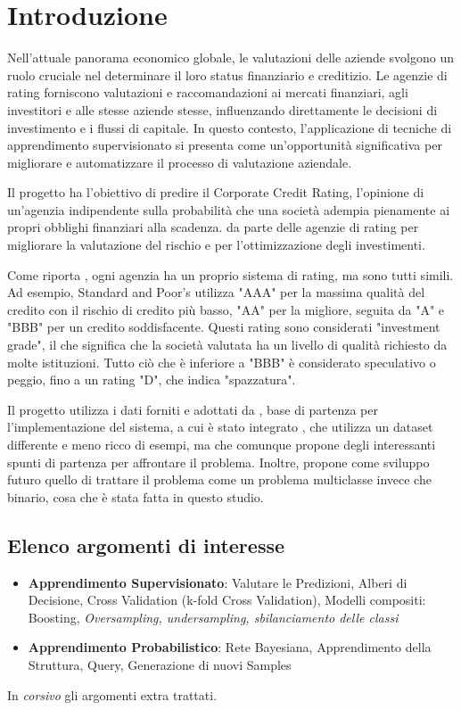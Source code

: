 \section{Introduzione}

\noindent Nell'attuale panorama economico globale, le valutazioni delle aziende svolgono un ruolo cruciale nel determinare il loro status finanziario e creditizio. Le agenzie di rating forniscono valutazioni e raccomandazioni ai mercati finanziari, agli investitori e alle stesse aziende stesse, influenzando direttamente le decisioni di investimento e i flussi di capitale. In questo contesto, l'applicazione di tecniche di apprendimento supervisionato si presenta come un'opportunità significativa per migliorare e automatizzare il processo di valutazione aziendale.

\noindent Il progetto ha l'obiettivo di predire il Corporate Credit Rating, l'opinione di un'agenzia indipendente sulla probabilità che una società adempia pienamente ai propri obblighi finanziari alla scadenza. da parte delle agenzie di rating per migliorare la valutazione del rischio e per l'ottimizzazione degli investimenti.

\noindent Come riporta \cite{investopediacorporatecredit}, ogni agenzia ha un proprio sistema di rating, ma sono tutti simili. Ad esempio, Standard and Poor's utilizza "AAA" per la massima qualità del credito con il rischio di credito più basso, "AA" per la migliore, seguita da "A" e "BBB" per un credito soddisfacente. Questi rating sono considerati "investment grade", il che significa che la società valutata ha un livello di qualità richiesto da molte istituzioni. Tutto ciò che è inferiore a "BBB" è considerato speculativo o peggio, fino a un rating "D", che indica "spazzatura".

\noindent Il progetto utilizza i dati forniti e adottati da \cite{makwana2022get}, base di partenza per l'implementazione del sistema, a cui è stato integrato \cite{nguyen2021multimodal}, che utilizza un dataset differente e meno ricco di esempi, ma che comunque propone degli interessanti spunti di partenza per affrontare il problema.
Inoltre, \cite{makwana2022get} propone come sviluppo futuro quello di trattare il problema come un problema multiclasse invece che binario, cosa che è stata fatta in questo studio.
\subsection{Elenco argomenti di interesse}

\begin{itemize}[label=-]
    \item \textbf{Apprendimento Supervisionato}\cite{PooleMackworth23Ch7}: Valutare le Predizioni, Alberi di Decisione, Cross Validation (k-fold Cross Validation), Modelli compositi: Boosting, \textit{Oversampling, undersampling, sbilanciamento delle classi}
    \item \textbf{Apprendimento Probabilistico}\cite{PooleMackworth23Ch10}: Rete Bayesiana, Apprendimento della Struttura, Query, Generazione di nuovi Samples
\end{itemize}
\noindent In \textit{corsivo} gli argomenti extra trattati.